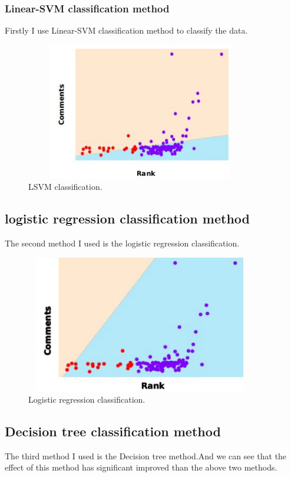 \documentclass[12pt, a4paper]{article}
\begin{document}
   \subsubsection{Linear-SVM classification method}
Firstly I use Linear-SVM classification method\cite{chang2008feature} to classify the data. 
\begin{figure}[ht]
    \centering
    \includegraphics[width=10cm,height=6cm]{p9.png}
    \caption{LSVM classification.}
\end{figure}
\newpage
\subsection{logistic regression classification method}
The second method I used is the logistic regression classification.

\begin{figure}[ht]
    \centering
    \includegraphics[width=10cm,height=6cm]{p10.png}
    \caption{Logistic regression classification.}
\end{figure}

\subsection{Decision tree classification method}
The third method I used is the Decision tree method.And we can see that the effect
of this method has significant improved than the above two methods.
\end{document}
